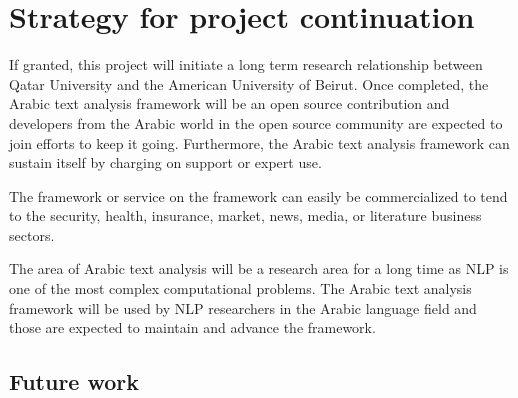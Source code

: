 \documentclass[12pt]{article}
\begin{document}
\section{Strategy for project continuation}
\label{s:continue}

If granted, this project will initiate a long term
research relationship between Qatar University
and the American University of Beirut. 
Once completed, the Arabic text analysis framework will be 
an open source contribution and developers from the Arabic 
world in the open source community are expected to join 
efforts to keep it going.
Furthermore, the Arabic text analysis framework 
can sustain itself by charging on support or expert use.

The framework or service on the framework can easily be 
commercialized to tend to the security, health, insurance, market,
news, media, or literature business sectors.
 
The area of Arabic text analysis will be a research area for 
a long time as NLP is one of the most complex computational 
problems.
The Arabic text analysis framework will be used by NLP 
researchers in the Arabic language field and those are 
expected to maintain and advance the framework.

\subsection{Future work}
\end{document}

